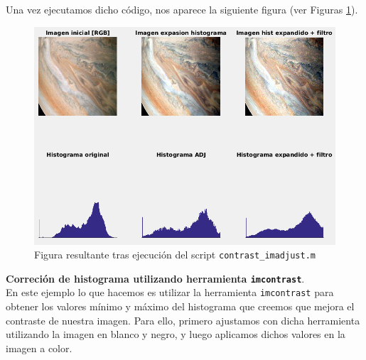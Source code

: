 \documentclass[12pt]{article}
\begin{document}
	\noindent Una vez ejecutamos dicho código, nos aparece la siguiente figura (ver Figuras \ref{img: contraste imadjust}).
	
	\begin{figure}[h]
		\begin{center}
			\includegraphics[width=1\textwidth]{img/contrast_imadjust.png}
			\caption{Figura resultante tras ejecución del script \texttt{contrast\_imadjust.m}}
			\label{img: contraste imadjust}
		\end{center}
	\end{figure}
	
	\pagebreak
	
	\noindent \textbf{\large Correción de histograma utilizando herramienta \texttt{imcontrast}}. \\ 
	
	\noindent En este ejemplo lo que hacemos es utilizar la herramienta \texttt{imcontrast} para obtener los valores mínimo y máximo del histograma que creemos que mejora el contraste de nuestra imagen. Para ello, primero ajustamos con dicha herramienta utilizando la imagen en blanco y negro, y luego aplicamos dichos valores en la imagen a color.
	
	\vspace{10px}
	
\end{document}
